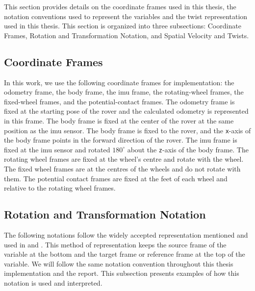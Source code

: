 \documentclass[report.tex]{subfiles}
\begin{document}
    This section provides details on the coordinate frames used in this thesis, the notation conventions used to represent the variables and the twist representation used in this thesis. This section is organized into three subsections: Coordinate Frames, Rotation and Transformation Notation, and Spatial Velocity and Twists.

\subsection{Coordinate Frames}
\label{subsec:background_coordinate_frames}


    In this work, we use the following coordinate frames for implementation: the odometry frame, the body frame, the \gls{imu} frame, the rotating-wheel frames, the fixed-wheel frames, and the potential-contact frames. The odometry frame is fixed at the starting pose of the rover and the calculated odometry is represented in this frame. The body frame is fixed at the center of the rover at the same position as 
    the \gls{imu} sensor. The body frame is fixed to the rover, and the \texttt{x}-axis of the body frame points in the forward direction of the rover. The \gls{imu} frame is fixed at the \gls{imu} sensor and rotated $180^{\circ}$ about the \texttt{z}-axis of the body frame. The rotating wheel frames are fixed at the wheel's centre and rotate with the wheel. The fixed wheel frames are at the centres of the wheels and do not rotate with them. The potential contact frames are fixed at the feet of each wheel and relative to the rotating wheel frames. 

\subsection{Rotation and Transformation Notation}
\label{subsec:background_transformation_notation}

    The following notations follow the widely accepted representation mentioned and used in \cite{BOOK-ModernRobotics} and \cite{BOOK-RigidBodyDynamicsAlgorithms}. This method of representation keeps the source frame of the variable at the bottom and the target frame or reference frame at the top of the variable. We will follow the same notation convention throughout this thesis implementation and the report. This subsection presents examples of how this notation is used and interpreted. 
        
\end{document}
